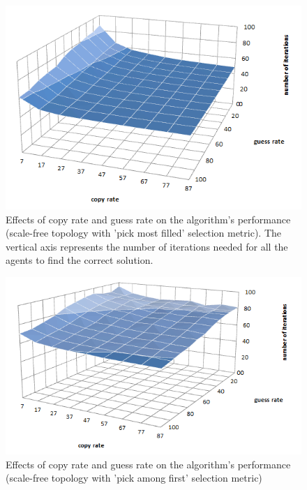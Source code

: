 \documentclass{article}
\begin{document}
\begin{figure}
\includegraphics[scale=0.60]{copy_guess_free_most}
\caption{Effects of copy rate and guess rate on the algorithm's performance (scale-free topology with 'pick most filled' selection metric). The vertical axis represents the number of iterations needed for all the agents to find the correct solution.
}
\label{fig:copy_guess_free_most}
\end{figure}

\begin{figure}
\includegraphics[scale=0.60]{copy_guess_free_prob}
\caption{Effects of copy rate and guess rate on the algorithm's performance (scale-free topology with 'pick among first' selection metric)
}
\label{fig:copy_guess_free_prob}
\end{figure}
\end{document}

